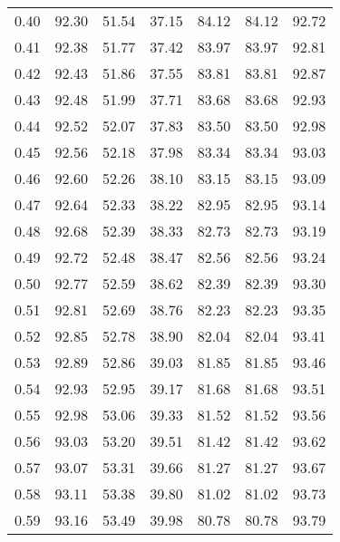 \begin{tabular}{|c|c|c|c|c|c|c|}
      0.40 &     92.30 &     51.54 &      37.15 &   84.12 &      84.12 &         92.72 \\
      0.41 &     92.38 &     51.77 &      37.42 &   83.97 &      83.97 &         92.81 \\
      0.42 &     92.43 &     51.86 &      37.55 &   83.81 &      83.81 &         92.87 \\
      0.43 &     92.48 &     51.99 &      37.71 &   83.68 &      83.68 &         92.93 \\
      0.44 &     92.52 &     52.07 &      37.83 &   83.50 &      83.50 &         92.98 \\
      0.45 &     92.56 &     52.18 &      37.98 &   83.34 &      83.34 &         93.03 \\
      0.46 &     92.60 &     52.26 &      38.10 &   83.15 &      83.15 &         93.09 \\
      0.47 &     92.64 &     52.33 &      38.22 &   82.95 &      82.95 &         93.14 \\
      0.48 &     92.68 &     52.39 &      38.33 &   82.73 &      82.73 &         93.19 \\
      0.49 &     92.72 &     52.48 &      38.47 &   82.56 &      82.56 &         93.24 \\
      0.50 &     92.77 &     52.59 &      38.62 &   82.39 &      82.39 &         93.30 \\
      0.51 &     92.81 &     52.69 &      38.76 &   82.23 &      82.23 &         93.35 \\
      0.52 &     92.85 &     52.78 &      38.90 &   82.04 &      82.04 &         93.41 \\
      0.53 &     92.89 &     52.86 &      39.03 &   81.85 &      81.85 &         93.46 \\
      0.54 &     92.93 &     52.95 &      39.17 &   81.68 &      81.68 &         93.51 \\
      0.55 &     92.98 &     53.06 &      39.33 &   81.52 &      81.52 &         93.56 \\
      0.56 &     93.03 &     53.20 &      39.51 &   81.42 &      81.42 &         93.62 \\
      0.57 &     93.07 &     53.31 &      39.66 &   81.27 &      81.27 &         93.67 \\
      0.58 &     93.11 &     53.38 &      39.80 &   81.02 &      81.02 &         93.73 \\
      0.59 &     93.16 &     53.49 &      39.98 &   80.78 &      80.78 &         93.79 \\

\end{tabular}
